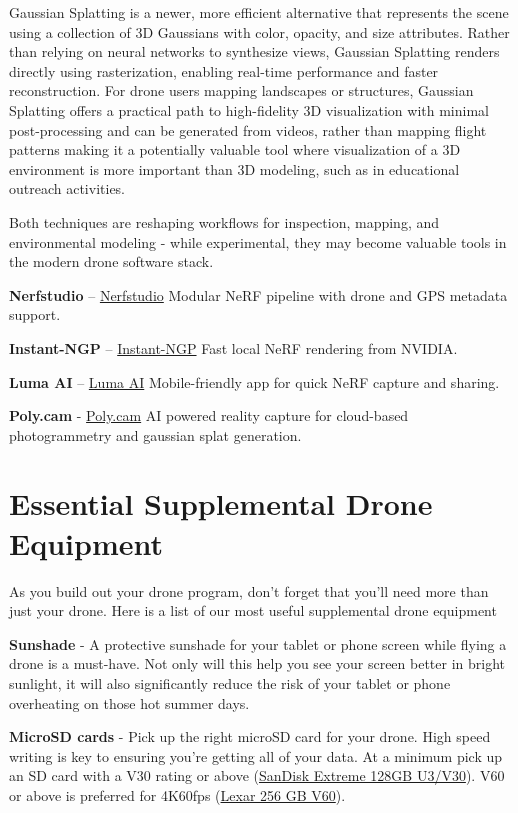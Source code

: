 \documentclass[
  12pt,
]{book}
\begin{document}
Gaussian Splatting is a newer, more efficient alternative that represents the scene using a collection of 3D Gaussians with color, opacity, and size attributes. Rather than relying on neural networks to synthesize views, Gaussian Splatting renders directly using rasterization, enabling real-time performance and faster reconstruction. For drone users mapping landscapes or structures, Gaussian Splatting offers a practical path to high-fidelity 3D visualization with minimal post-processing and can be generated from videos, rather than mapping flight patterns making it a potentially valuable tool where visualization of a 3D environment is more important than 3D modeling, such as in educational outreach activities.

Both techniques are reshaping workflows for inspection, mapping, and environmental modeling - while experimental, they may become valuable tools in the modern drone software stack.

\textbf{Nerfstudio} -- \href{https://docs.nerf.studio/}{Nerfstudio} Modular NeRF pipeline with drone and GPS metadata support.

\textbf{Instant-NGP} -- \href{https://github.com/NVlabs/instant-ngp}{Instant-NGP} Fast local NeRF rendering from NVIDIA.

\textbf{Luma AI} -- \href{https://lumalabs.ai/}{Luma AI} Mobile-friendly app for quick NeRF capture and sharing.

\textbf{Poly.cam} - \href{https://poly.cam/}{Poly.cam} AI powered reality capture for cloud-based photogrammetry and gaussian splat generation.

\section{Essential Supplemental Drone Equipment}\label{essential-supplemental-drone-equipment}

As you build out your drone program, don't forget that you'll need more than just your drone. Here is a list of our most useful supplemental drone equipment

\textbf{Sunshade} - A protective sunshade for your tablet or phone screen while flying a drone is a must-have. Not only will this help you see your screen better in bright sunlight, it will also significantly reduce the risk of your tablet or phone overheating on those hot summer days.

\textbf{MicroSD cards} - Pick up the right microSD card for your drone. High speed writing is key to ensuring you're getting all of your data. At a minimum pick up an SD card with a V30 rating or above (\href{https://www.amazon.com/SanDisk-Extreme-microSDXC-Memory-Adapter/dp/B07FCMKK5X?th=1}{SanDisk Extreme 128GB U3/V30}). V60 or above is preferred for 4K60fps (\href{https://www.amazon.com/Lexar-microSDXC-Professional-Adapter-Class10/dp/B09FJHMLC6/}{Lexar 256 GB V60}).
\end{document}
